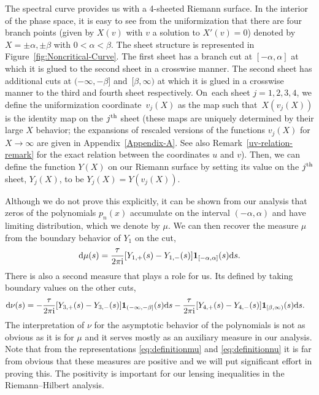 \documentclass[10pt,a4paper]{amsart}
\numberwithin{equation}{section}
\begin{document}
 The spectral curve provides us with a 4-sheeted Riemann surface. In the interior of the phase space, it is easy to see from the uniformization that there are four branch points (given by $X(v)$ with $v$ a solution to $X'(v)=0$) denoted by $X=\pm \alpha, \pm \beta$ with $0<\alpha<\beta$. The sheet structure is represented in Figure~\ref{fig:Noncritical-Curve}. The first sheet has a branch cut at $[-\alpha,\alpha]$ at which it is glued to the second sheet in a crosswise manner. The second sheet has additional cuts at $(-\infty,-\beta]$ and~${[\beta,\infty)}$ at which it is glued in a crosswise manner to the third and fourth sheet respectively. On~each sheet $j=1,2,3,4$, we define the uniformization coordinate~$v_j(X)$ as the map such that~$X(v_j(X))$
 is the identity map on the $j^{\rm th}$ sheet (these maps are uniquely determined by their large $X$ behavior; the expansions of rescaled versions of the functions $v_j(X)$ for $X\to\infty$ are given in Appendix~\ref{Appendix-A}. See also Remark~\ref{uv-relation-remark} for the exact relation between the coordinates $u$ and $v$). Then, we can define the function $Y(X)$ on our Riemann surface
 by setting its value on the $j^{\rm th}$ sheet, $Y_j(X)$, to be $Y_j(X) = Y(v_j(X))$.

 Although we do not prove this explicitly, it can be shown from our analysis that zeros of the polynomials $p_n(x)$ accumulate on the interval $(-\alpha,\alpha)$ and have limiting distribution, which we denote by $\mu$. We can then recover the measure $\mu$ from the boundary behavior of $Y_1$ on the cut,
 \begin{equation} \label{eq:definitionmu}
 {\rm d}\mu(s) = \frac{\tau}{2\pi {\rm i}}[Y_{1,+}(s) - Y_{1,-}(s)]{\bf 1}_{[-\alpha,\alpha]}(s){\rm d}s.
 \end{equation}
 There is also a second measure that plays a role for us. Its defined by taking boundary values on the other cuts,
 \begin{align}\label{eq:definitionnu}
 &{\rm d}\nu(s)= -\frac{\tau}{2\pi {\rm i}}[Y_{3,+}(s) - Y_{3,-}(s)]{\bf 1}_{(-\infty,-\beta]}(s){\rm d}s -\frac{\tau}{2\pi {\rm i}}[Y_{4,+}(s) - Y_{4,-}(s)]{\bf 1}_{[\beta,\infty)}(s){\rm d}s.
 \end{align}
 The interpretation of $\nu$ for the asymptotic behavior of the polynomials is not as obvious as it is for $\mu$ and it serves mostly as an auxiliary measure in our analysis. Note that from the representations \eqref{eq:definitionmu} and \eqref{eq:definitionnu} it is far from obvious that these measures are positive and we will put significant effort in proving this. The positivity is important for our lensing inequalities in the Riemann--Hilbert analysis.
\end{document}
